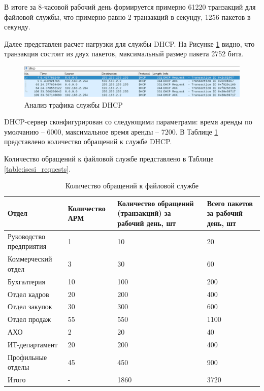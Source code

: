 \documentclass[14pt, a4paper]{extarticle}
\numberwithin{equation}{section}
\begin{document}
В итоге за 8-часовой рабочий день формируется примерно 61220 транзакций для 
файловой службы, что примерно равно 
2 транзакций в секунду, 1256 пакетов в секунду.

Далее представлен расчет нагрузки для службы DHCP. На Рисунке \ref{fig:wireshark_dhcp_dump} видно, что транзакция состоит из двух пакетов,
максимальный размер пакета 2752 бита.

\begin{figure}[H]
        \centering
        \includegraphics[scale=0.5]{dhcp_wireshark.png}
        \caption{Анализ трафика службы DHCP}
        \label{fig:wireshark_dhcp_dump}
\end{figure}

DHCP-сервер сконфигурирован со следующими параметрами: 
время аренды по умолчанию – 6000, максимальное время аренды – 7200.
В Таблице \ref{table:dhcp_requests} представлено количество обращений к службе DHCP. 


Количество обращений к файловой службе представлено в Таблице \ref{table:iscsi_requests}.
\begin{table}[H]
\centering
\small
\caption{Количество обращений к файловой службе}
\label{table:dhcp_requests}
\begin{tabular}{|m{3cm}|m{3cm}|m{4cm}|m{3cm}|}
\hline
\textbf{Отдел} & \textbf{Количество АРМ} & \textbf{Количество обращений (транзакций) за рабочий день, шт } & \textbf{Всего пакетов за рабочий день, шт }\\
\hline
Руководство предприятия & 1 & 10 & 20\\
\hline
Коммерческий отдел & 3 & 30 & 60 \\
\hline
Бухгалтерия & 10 & 100 & 200\\
\hline
Отдел кадров & 20 & 200 & 400\\
\hline
Отдел закупок & 30 & 300 & 600\\
\hline
Отдел продаж & 55 & 550 & 1100\\
\hline
АХО & 2 & 20 & 40\\
\hline
ИТ-департамент & 20 & 200 & 400\\
\hline
Профильные отделы & 45 & 450 & 900\\
\hline
Итого & - & 1860 & 3720\\
\hline
\end{tabular}
\end{table}
\end{document}
